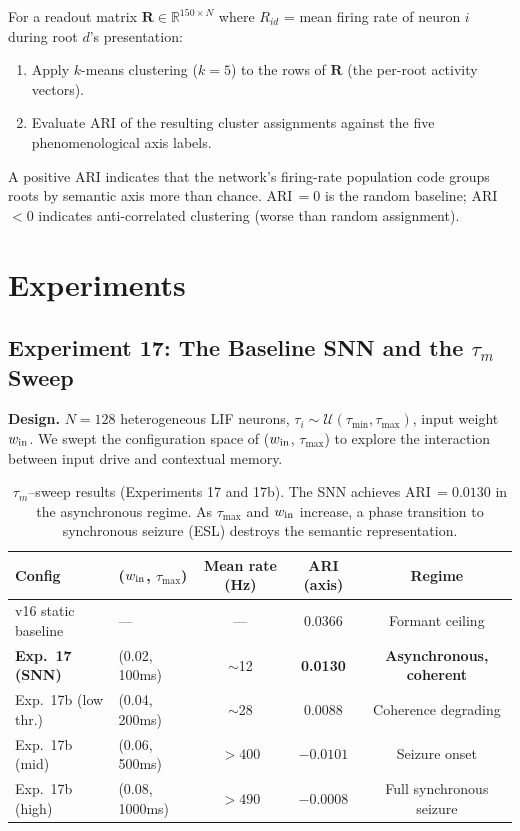 \documentclass{article}
\begin{document}
For a readout matrix $\mathbf{R} \in \mathbb{R}^{150 \times N}$ where $R_{id}$ = mean firing rate of neuron $i$ during root $d$'s presentation:
\begin{enumerate}[label=(\roman*)]
  \item Apply $k$-means clustering ($k = 5$) to the rows of $\mathbf{R}$ (the per-root activity vectors).
  \item Evaluate ARI of the resulting cluster assignments against the five phenomenological axis labels.
\end{enumerate}
A positive ARI indicates that the network's firing-rate population code groups roots by semantic axis more than chance. ARI\,$= 0$ is the random baseline; ARI\,$< 0$ indicates anti-correlated clustering (worse than random assignment).

\section{Experiments}
\label{sec:experiments}

\subsection{Experiment 17: The Baseline SNN and the $\tau_m$ Sweep}

\textbf{Design.} $N = 128$ heterogeneous LIF neurons, $\tau_i \sim \mathcal{U}(\tau_{\min}, \tau_{\max})$, input weight $w_{\rm in}$. We swept the configuration space of ($w_{\rm in}$, $\tau_{\max}$) to explore the interaction between input drive and contextual memory.

\begin{table}[htbp]
\centering
\renewcommand{\arraystretch}{1.3}
\begin{tabular}{llccc}
\toprule
\textbf{Config} & \textbf{($w_{\rm in}$, $\tau_{\max}$)} & \textbf{Mean rate (Hz)} & \textbf{ARI (axis)} & \textbf{Regime}\\
\midrule
v16 static baseline       & --- & ---      & 0.0366   & Formant ceiling\\
\textbf{Exp.~17 (SNN)}   & (0.02, 100ms) & $\sim$12 & \textbf{0.0130} & \textbf{Asynchronous, coherent}\\
Exp.~17b (low thr.)      & (0.04, 200ms) & $\sim$28 & 0.0088   & Coherence degrading\\
Exp.~17b (mid)            & (0.06, 500ms) & $>400$   & $-0.0101$& Seizure onset\\
Exp.~17b (high)           & (0.08, 1000ms)& $>490$   & $-0.0008$& Full synchronous seizure\\
\bottomrule
\end{tabular}
\caption{$\tau_m$--sweep results (Experiments 17 and 17b). The SNN achieves ARI\,$=0.0130$ in the asynchronous regime. As $\tau_{\max}$ and $w_{\rm in}$ increase, a phase transition to synchronous seizure (ESL) destroys the semantic representation.}
\label{tab:sweep}
\end{table}
\end{document}
